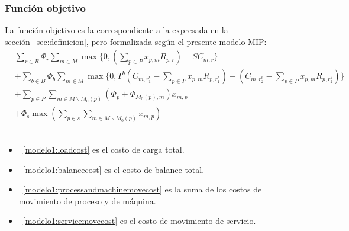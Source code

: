 \documentclass[../informe2.tex]{subfiles}
\begin{document}
\subsubsection{Función objetivo}
La función objetivo es la correspondiente a la expresada en la sección~\ref{sec:definicion}, pero formalizada según el presente modelo MIP:\\
\begin{align}
	\label{modelo1:loadcost}& \sum_{r \in R}\Phi_{r}\sum_{m \in M}\max \{ 0,(\sum_{p \in P}x_{p,m}R_{p,r}) - SC_{m,r} \} \\
	\label{modelo1:balancecost}&+ \sum_{b \in B}\Phi_{b}\sum_{m \in M}\max\{0, T^b(C_{m,r_{1}^b} - \sum_{p \in P}x_{p,m}R_{p,r_{1}^b}) - (C_{m,r_{2}^b} - \sum_{p \in P}x_{p,m}R_{p,r_{2}^b})\} \\
	\label{modelo1:processandmachinemovecost}&+ \sum_{p \in P}\sum_{m \in M \backslash M_0(p)}(\Phi_{p} + \Phi_{M_0(p),m})x_{m,p} \\
	\label{modelo1:servicemovecost}&+ \Phi_{s}\max(\sum_{p \in s}\sum_{m \in M \backslash M_0(p)}x_{m,p})
\end{align}
\\
\begin{itemize}
	\item~\eqref{modelo1:loadcost} es el costo de carga total.
	\item~\eqref{modelo1:balancecost} es el costo de balance total.
	\item~\eqref{modelo1:processandmachinemovecost} es la suma de los costos de movimiento de proceso y de máquina.
	\item~\eqref{modelo1:servicemovecost} es el costo de movimiento de servicio.
\end{itemize}
\end{document}

